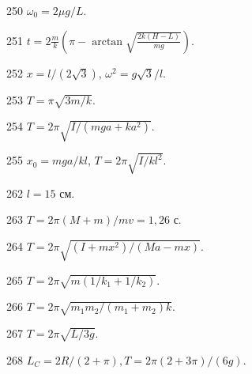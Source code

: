 \begin{Answer}{250}
$\omega_0 = 2\mu g /L$.
\end{Answer}
\begin{Answer}{251}
$t = 2\frac{m}{k}\left( \pi - \arctan \sqrt{\frac{2k(H-L)}{mg}}\right)$.
\end{Answer}
\begin{Answer}{252}
$x = l/(2\sqrt{3})$, $\omega^2 = g\sqrt{3} / l$.
\end{Answer}
\begin{Answer}{253}
$T =  \pi\sqrt{3m/k}$.
\end{Answer}
\begin{Answer}{254}
$T = 2 \pi \sqrt{I/(mga + ka^2)}$.
\end{Answer}
\begin{Answer}{255}
$x_0 = mga/kl$, $T = 2 \pi \sqrt{I/kl^2}$.
\end{Answer}
\begin{Answer}{262}
$l = 15$ см.
\end{Answer}
\begin{Answer}{263}
$T = 2 \pi (M+m) / mv = 1,26$ с.
\end{Answer}
\begin{Answer}{264}
$T = 2 \pi \sqrt{(I+mx^2)/(Ma - mx)}$.
\end{Answer}
\begin{Answer}{265}
$T = 2 \pi \sqrt{m(1/k_1 + 1/k_2)}$.
\end{Answer}
\begin{Answer}{266}
$T = 2 \pi \sqrt{m_1m_2/(m_1 + m_2)k}$.
\end{Answer}
\begin{Answer}{267}
$T = 2 \pi \sqrt{L/3g}$.
\end{Answer}
\begin{Answer}{268}
$L_C = 2R/(2 + \pi), T = 2 \pi (2 + 3\pi)/(6g)$.
\end{Answer}
